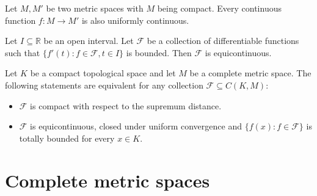 	\begin{theorem}
		Let $M, M'$ be two metric spaces with $M$ being compact. Every continuous function $f:M\rightarrow M'$ is also uniformly continuous.
	\end{theorem}
	

	
	\begin{property}
		Let $I\subseteq\mathbb{R}$ be an open interval. Let $\mathcal{F}$ be a collection of differentiable functions such that $\{f'(t):f\in\mathcal{F}, t\in I\}$ is bounded. Then $\mathcal{F}$ is equicontinuous.
	\end{property}
	
	\begin{theorem}
		Let $K$ be a compact topological space and let $M$ be a complete metric space. The following statements are equivalent for any collection $\mathcal{F}\subseteq C(K, M)$:
		\begin{itemize}
			\item $\mathcal{F}$ is compact with respect to the supremum distance\footnotemark.
			\item $\mathcal{F}$ is equicontinuous, closed under uniform convergence and $\{f(x):f\in\mathcal{F}\}$ is totally bounded for every $x\in K$.
		\end{itemize}
	\end{theorem}

\section{Complete metric spaces}
    
